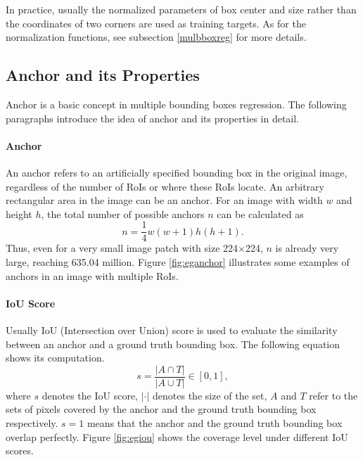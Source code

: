 

In practice, usually the normalized parameters of box center and size rather than the coordinates of two corners are used as training targets. As for the normalization functions, see subsection \ref{mulbboxreg} for more details.

\subsection{Anchor and its Properties}\label{ancpro}
Anchor is a basic concept in multiple bounding boxes regression. The following paragraphs introduce the idea of anchor and its properties in detail.

\paragraph{Anchor}
An anchor refers to an artificially specified bounding box in the original image, regardless of the number of RoIs or where these RoIs locate. An arbitrary rectangular area in the image can be an anchor. For an image with width $w$ and height $h$, the total number of possible anchors $n$ can be calculated as
\begin{equation}\label{eq:numanchor}
	n = \frac{1}{4}w(w+1)h(h+1).
\end{equation}
Thus, even for a very small image patch with size 224$\times$224, $n$ is already very large, reaching 635.04 million. Figure \ref{fig:eganchor} illustrates some examples of anchors in an image with multiple RoIs.



\paragraph{IoU Score}
Usually IoU (Intersection over Union) score is used to evaluate the similarity between an anchor and a ground truth bounding box. The following equation shows its computation.
\begin{equation}
	s = \frac{\lvert A \cap T \rvert}{\lvert A \cup T \rvert} \in [0, 1],
\end{equation}
where $s$ denotes the IoU score, $\lvert \cdot \rvert$ denotes the size of the set, $A$ and $T$ refer to the sets of pixels covered by the anchor and the ground truth bounding box respectively. $s = 1$ means that the anchor and the ground truth bounding box overlap perfectly. Figure \ref{fig:egiou} shows the coverage level under different IoU scores.

